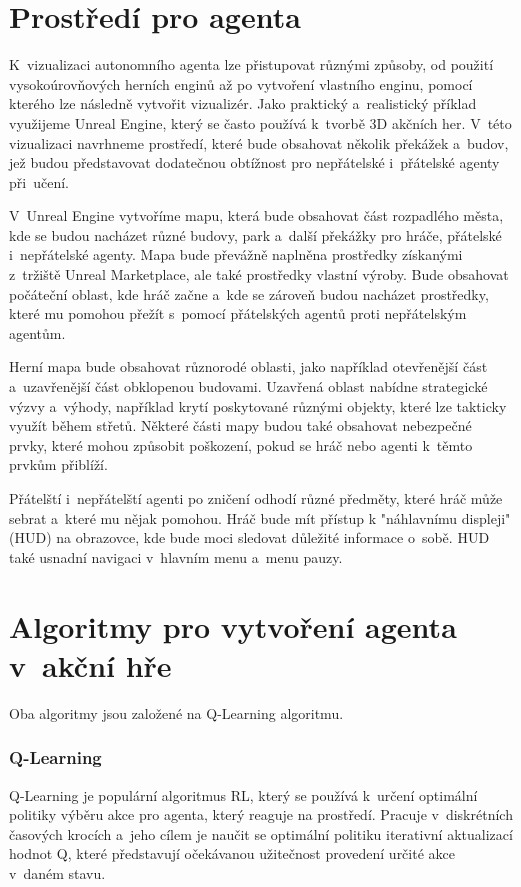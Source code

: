 \section{Prostředí pro agenta}
K~vizualizaci autonomního agenta lze přistupovat různými způsoby, od použití vysokoúrovňových herních enginů až po vytvoření vlastního enginu, pomocí kterého lze následně vytvořit vizualizér. Jako praktický a~realistický příklad využijeme Unreal Engine, který se často používá k~tvorbě 3D akčních her. V~této vizualizaci navrhneme prostředí, které bude obsahovat několik překážek a~budov, jež budou představovat dodatečnou obtížnost pro nepřátelské i~přátelské agenty při~učení.

V~Unreal Engine vytvoříme mapu, která bude obsahovat část rozpadlého města, kde se budou nacházet různé budovy, park a~další překážky pro hráče, přátelské i~nepřátelské agenty. Mapa bude převážně naplněna prostředky získanými z~tržiště Unreal Marketplace, ale také prostředky vlastní výroby. Bude obsahovat počáteční oblast, kde hráč začne a~kde se zároveň budou nacházet prostředky, které mu pomohou přežít s~pomocí přátelských agentů proti nepřátelským agentům.

Herní mapa bude obsahovat různorodé oblasti, jako například otevřenější část a~uzavřenější část obklopenou budovami. Uzavřená oblast nabídne strategické výzvy a~výhody, například krytí poskytované různými objekty, které lze takticky využít během střetů. Některé části mapy budou také obsahovat nebezpečné prvky, které mohou způsobit poškození, pokud se hráč nebo agenti k~těmto prvkům přiblíží.

Přátelští i~nepřátelští agenti po zničení odhodí různé předměty, které hráč může sebrat a~které mu nějak pomohou. Hráč bude mít přístup k "náhlavnímu displeji" (HUD) na obrazovce, kde bude moci sledovat důležité informace o~sobě. HUD také usnadní navigaci v~hlavním menu a~menu pauzy.

\newpage

\section{Algoritmy pro vytvoření agenta v~akční hře}
Oba algoritmy jsou založené na Q-Learning algoritmu.
\subsubsection{Q-Learning}
Q-Learning\cite{Watkins1992} je populární algoritmus RL, který se používá k~určení optimální politiky výběru akce pro agenta, který reaguje na prostředí. Pracuje v~diskrétních časových krocích a~jeho cílem je naučit se optimální politiku iterativní aktualizací hodnot Q, které představují očekávanou užitečnost provedení určité akce v~daném stavu.

